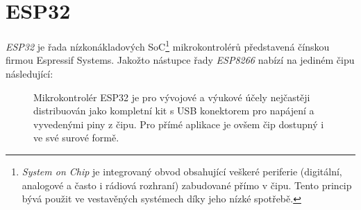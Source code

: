 \section{ESP32}\label{sec:esp32}
\textit{ESP32} je řada nízkonákladových SoC\footnote{\textit{System on Chip} je integrovaný obvod obsahující veškeré
periferie (digitální, analogové a často i rádiová rozhraní) zabudované přímo v čipu.
Tento princip bývá použit ve vestavěných systémech díky jeho nízké spotřebě.} mikrokontrolérů představená čínskou
firmou Espressif Systems.
Jakožto nástupce řady \textit{ESP8266} nabízí na jediném čipu následující:

\begin{figure}
    \centering


    \caption{Mikrokontrolér ESP32 je pro vývojové a výukové účely nejčastěji distribuován jako kompletní kit s USB
    konektorem pro napájení a vyvedenými piny z čipu. %
    Pro přímé aplikace je ovšem čip dostupný i ve své surové formě.}

\end{figure}

